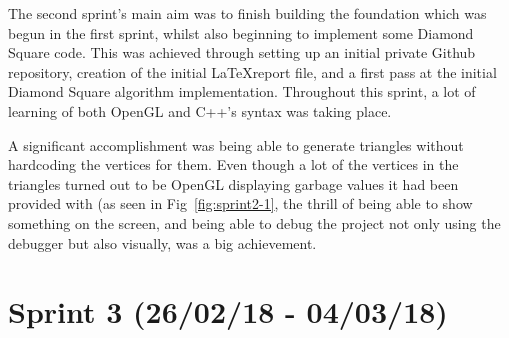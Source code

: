 \documentclass[a4paper,10pt]{report}
\begin{document}
The second sprint's main aim was to finish building the foundation which was begun in the first sprint, whilst also beginning to implement some Diamond Square code. This was achieved through setting up an initial private Github repository, creation of the initial \LaTeX report file, and a first pass at the initial Diamond Square algorithm implementation. Throughout this sprint, a lot of learning of both OpenGL and C++'s syntax was taking place.  \medskip

A significant accomplishment was being able to generate triangles without hardcoding the vertices for them. Even though a lot of the vertices in the triangles turned out to be OpenGL displaying garbage values it had been provided with (as seen in Fig~\ref{fig:sprint2-1}, the thrill of being able to show something on the screen, and being able to debug the project not only using the debugger but also visually, was a big achievement. 

\clearpage

\section{Sprint 3 (26/02/18 - 04/03/18)}
\end{document}
